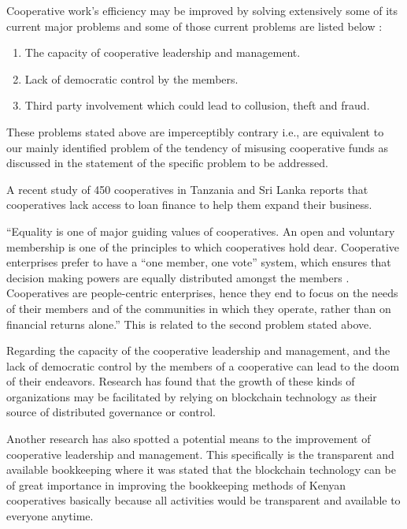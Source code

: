 \documentclass{article}
\begin{document}
\begin{flushleft}
Cooperative work's efficiency may be improved by solving extensively some of its current major problems and some of those current problems are listed below \cite{rca001}:
\begin{enumerate}
    \item The capacity of cooperative leadership and management.
    \item Lack of democratic control by the members.
    \item Third party involvement which could lead to collusion, theft and fraud.
\end{enumerate} 

These problems stated above are imperceptibly contrary i.e., are equivalent to our mainly identified problem of the tendency of misusing cooperative funds as discussed in the statement of the specific problem to be addressed. 

A recent study of 450 cooperatives in Tanzania and Sri Lanka reports that cooperatives lack access to loan finance to help them expand their business. 
 
“Equality is one of major guiding values of cooperatives. An open and voluntary membership is one of the principles to which cooperatives hold dear. Cooperative enterprises prefer to have a “one member, one vote” system, which ensures that decision making powers are equally distributed amongst the members . Cooperatives are people-centric enterprises, hence they end to focus on the needs of their members and of the communities in which they operate, rather than on financial returns alone.” \cite{un_issues} This is related to the second problem stated above.

Regarding the capacity of the cooperative leadership and management, and the lack of democratic control by the members of a cooperative can lead to the doom of their endeavors. Research has found that the growth of these kinds of organizations may be facilitated by relying on blockchain technology as their source of distributed governance or control. \cite{mannan2018fostering}

Another research has also spotted a potential means to the improvement of cooperative leadership and management. This specifically is the transparent and available bookkeeping where it was stated that the blockchain technology can be of great importance in improving the bookkeeping methods of Kenyan cooperatives basically because all activities would be transparent and available to everyone anytime. \cite{mitch_national}


\end{flushleft}
\end{document}
